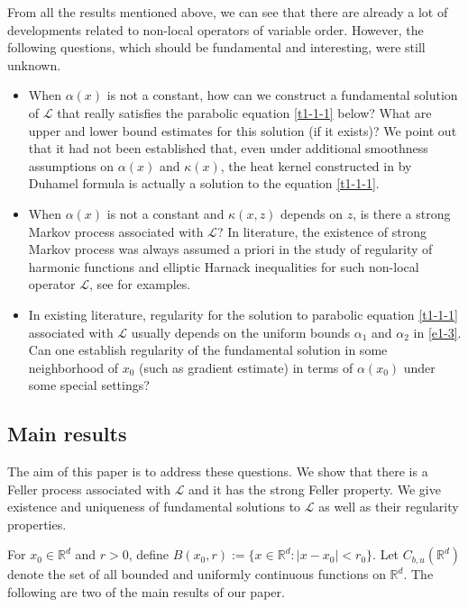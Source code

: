 \documentclass[a4paper,11pt]{amsart}
\newcommand{\R}{\mathds R}
\newcommand{\K}{\kappa}
\newcommand{\A}{\alpha}
\def\LL{{\mathcal L}}
\theoremstyle{definition}
\begin{document}
From all the results mentioned above, we can see that there are
already a lot of developments related to   non-local operators of
variable order. However, the following questions, which should be
fundamental and interesting, were still unknown.
\begin{itemize}
\item [(1)] When $\A(x)$ is not a constant, how can we construct a fundamental solution of $\LL$ that really satisfies
 the parabolic equation \eqref{t1-1-1} below?  What are upper
and lower bound estimates for this solution (if it exists)? We point out that it had not been established that,
even under additional smoothness assumptions on $\alpha (x)$ and $\kappa (x)$,
the  heat kernel constructed  in \cite{Kol}  by Duhamel formula is actually a solution to the equation \eqref{t1-1-1}.

\item[(2)] When $\A(x)$ is not a constant and $\K(x,z)$ depends on $z$, is there a strong Markov process
associated with $\LL$?  In literature, the existence of strong Markov process was
always assumed a priori  in the study of regularity of harmonic
functions and elliptic Harnack inequalities for such non-local operator $\LL$,
see \cite{BK1,BK2, LW} for examples.

\item[(3)] In existing literature,
  regularity for the solution to parabolic equation \eqref{t1-1-1} associated
with $\LL$ usually depends on
 the uniform bounds $\A_1$ and $\A_2$ in
\eqref{e1-3}.
Can one establish regularity of the fundamental solution in some neighborhood of  $x_0$ (such  as  gradient estimate) in terms of $\A(x_0)$ under some special settings?
\end{itemize}

\subsection{Main results} The aim of this paper is to address these questions.
We show that there is a Feller process associated with $\LL$ and it has the strong Feller property.
We give existence and uniqueness of fundamental solutions to $\LL$ as well as their regularity properties.

For $x_0\in \R^d$ and $r>0$, define  $B(x_0, r):=\{x\in \R^d: |x-x_0|<  r_0\}$.
Let $C_{b,u}(\R^d)$ denote the set of all bounded and uniformly continuous functions on $\R^d$.
The following are two  of the main results of our paper.
\end{document}
